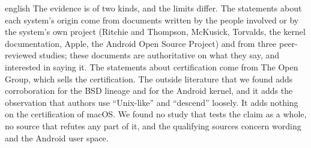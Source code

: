 \begin{onlyin}{english} %
The evidence is of two kinds, and the limits differ.
The statements about each system's origin come from documents written by
the people involved or by the system's own project (Ritchie and Thompson,
McKusick, Torvalds, the kernel documentation, Apple, the Android Open
Source Project) and from three peer-reviewed studies; these documents are
authoritative on what they say, and interested in saying it.
The statements about certification come from The Open Group, which sells
the certification.
The outside literature that we found adds corroboration for the BSD
lineage and for the Android kernel, and it adds the observation that
authors use \enquote{Unix-like} and \enquote{descend} loosely.
It adds nothing on the certification of macOS.
We found no study that tests the claim as a whole, no source that
refutes any part of it, and the qualifying sources concern wording and the
Android user space.


\end{onlyin}
